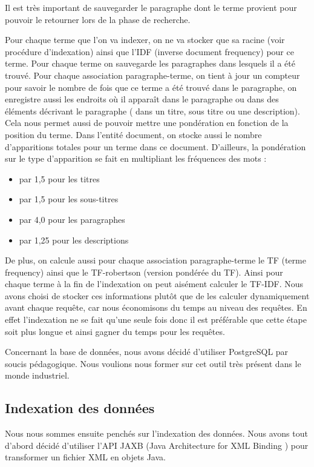 \documentclass{article}
\begin{document}
Il est très important de sauvegarder le paragraphe dont le terme provient pour
pouvoir le retourner lors de la phase de recherche. 

Pour chaque terme que l’on va indexer, on ne va stocker que sa racine (voir procédure
d’indexation) ainsi que l’IDF (inverse document frequency) pour ce terme. Pour chaque
terme on sauvegarde les paragraphes dans lesquels il a été trouvé. Pour chaque
association paragraphe-terme, on tient à jour un compteur pour savoir le nombre de
fois que ce terme a été trouvé dans le paragraphe, on enregistre aussi les endroits
où il apparaît dans le paragraphe ou dans des éléments décrivant le paragraphe ( dans
un titre, sous titre ou une description). Cela nous permet aussi de pouvoir mettre
une pondération en fonction de la position du terme.  Dans l’entité document, on
stocke aussi le nombre d’apparitions totales pour un terme dans ce document.
D’ailleurs, la pondération sur le type d’apparition se fait en multipliant les
fréquences des mots :

\begin{itemize}
    \item par 1,5 pour les titres
    \item par 1,5 pour les sous-titres
    \item par 4,0 pour les paragraphes
    \item par 1,25 pour les descriptions
\end{itemize}

De plus, on calcule aussi pour chaque association paragraphe-terme le TF (terme
frequency) ainsi que le TF-robertson (version pondérée du TF). Ainsi pour chaque terme
à la fin de l’indexation on peut aisément calculer le TF-IDF. Nous avons choisi de
stocker ces informations plutôt que de les calculer dynamiquement avant chaque
requête, car nous économisons du temps au niveau des requêtes. En effet l’indexation
ne se fait qu’une seule fois donc il est préférable que cette étape soit plus longue
et ainsi gagner du temps pour les requêtes. 

Concernant la base de données, nous avons décidé d’utiliser PostgreSQL par soucis
pédagogique. Nous voulions nous former sur cet outil très présent dans le monde
industriel.

\subsection{Indexation des données}

Nous nous sommes ensuite penchés sur l’indexation des données. Nous avons tout d’abord
décidé d’utiliser l’API JAXB (Java Architecture for XML Binding )  pour transformer
un fichier XML en objets Java. 
\end{document}
